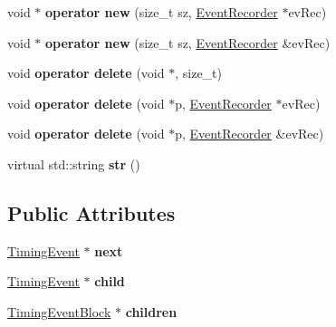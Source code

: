 \begin{DoxyCompactItemize}
\item 
\hypertarget{classTimingEvent_a9ecb818af70278d593b7b3532aad03e2}{void $\ast$ {\bfseries operator new} (size\-\_\-t sz, \hyperlink{classEventRecorder}{Event\-Recorder} $\ast$ev\-Rec)}\label{classTimingEvent_a9ecb818af70278d593b7b3532aad03e2}

\item 
\hypertarget{classTimingEvent_accb87e44bcbb3a7c4393d4f64af87192}{void $\ast$ {\bfseries operator new} (size\-\_\-t sz, \hyperlink{classEventRecorder}{Event\-Recorder} \&ev\-Rec)}\label{classTimingEvent_accb87e44bcbb3a7c4393d4f64af87192}

\item 
\hypertarget{classTimingEvent_a9efd2a85ed47175399f6a751c109f8a9}{void {\bfseries operator delete} (void $\ast$, size\-\_\-t)}\label{classTimingEvent_a9efd2a85ed47175399f6a751c109f8a9}

\item 
\hypertarget{classTimingEvent_a51a820e571e6bec1fbc9ed0cb751726a}{void {\bfseries operator delete} (void $\ast$p, \hyperlink{classEventRecorder}{Event\-Recorder} $\ast$ev\-Rec)}\label{classTimingEvent_a51a820e571e6bec1fbc9ed0cb751726a}

\item 
\hypertarget{classTimingEvent_ac920ad0905f611841f49c6232947a02e}{void {\bfseries operator delete} (void $\ast$p, \hyperlink{classEventRecorder}{Event\-Recorder} \&ev\-Rec)}\label{classTimingEvent_ac920ad0905f611841f49c6232947a02e}

\item 
\hypertarget{classTimingEvent_ad918cf0b44a8d7298fa4b70b95d04bab}{virtual std\-::string {\bfseries str} ()}\label{classTimingEvent_ad918cf0b44a8d7298fa4b70b95d04bab}

\end{DoxyCompactItemize}
\subsection*{Public Attributes}
\begin{DoxyCompactItemize}
\item 
\hypertarget{classTimingEvent_abc507c8b1de381ddcab68212609ead89}{\hyperlink{classTimingEvent}{Timing\-Event} $\ast$ {\bfseries next}}\label{classTimingEvent_abc507c8b1de381ddcab68212609ead89}

\item 
\hypertarget{classTimingEvent_ae9bb9c89858f97ec7aacfa371cca7edd}{\hyperlink{classTimingEvent}{Timing\-Event} $\ast$ {\bfseries child}}\label{classTimingEvent_ae9bb9c89858f97ec7aacfa371cca7edd}

\item 
\hypertarget{classTimingEvent_a98c9209a0010bea8ed7d5e3e0b46c718}{\hyperlink{structTimingEventBlock}{Timing\-Event\-Block} $\ast$ {\bfseries children}}\label{classTimingEvent_a98c9209a0010bea8ed7d5e3e0b46c718}

\end{DoxyCompactItemize}
